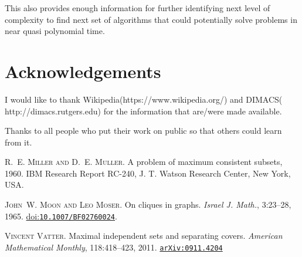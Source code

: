 \documentclass[12pt]{article}
\newcommand{\doi}[1]{\href{http://dx.doi.org/#1}{doi:\texttt{#1}}}
\newcommand{\arxiv}[1]{\href{http://arxiv.org/abs/#1}{\texttt{arXiv:#1}}}
\theoremstyle{plain}
\theoremstyle{definition}
\begin{document}
This also provides enough information for further identifying next level of complexity to find next set of algorithms that could potentially solve problems in near quasi polynomial time.

\section{Acknowledgements}
I would like to thank Wikipedia(https://www.wikipedia.org/) and DIMACS( http://dimacs.rutgers.edu) for the information that are/were made available.

Thanks to all people who put their work on public so that others could learn from it.

\begin{thebibliography}{B-N-R}

\textsc{R.~E. Miller and D.~E. Muller}.
\newblock A problem of maximum consistent subsets, 1960.
\newblock IBM Research Report RC-240, J. T. Watson Research Center, New York,
USA.

\textsc{John~W. Moon and Leo Moser}.
\newblock On cliques in graphs.
\newblock \emph{Israel J. Math.}, 3:23--28, 1965.
\newblock \doi{10.1007/BF02760024}.

\textsc{Vincent Vatter}.
\newblock Maximal independent sets and separating covers.
\newblock \emph{American Mathematical Monthly}, 118:418--423, 2011.
\newblock \arxiv{0911.4204}


\end{thebibliography}
\end{document}
